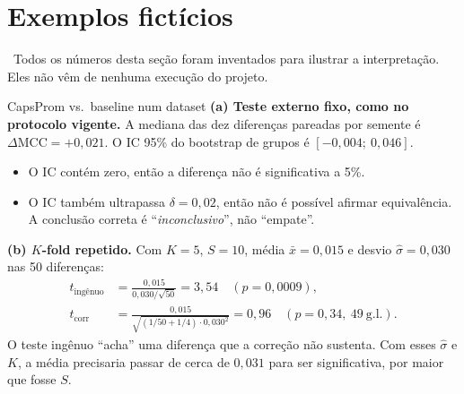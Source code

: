 \documentclass[11pt,a4paper]{article}
\newcommand{\etiqueta}[2]{\tcbox[on line, colback=#1!10, colframe=#1!75!black,
  boxrule=0.4pt, arc=1.2pt, left=1.5pt, right=1.5pt, top=0pt, bottom=0pt,
  fontupper=\sffamily\scriptsize\bfseries]{#2}}
\newcommand{\fic}{\etiqueta{oiPurple}{Fictício}}
\newcommand{\MCC}{\mathrm{MCC}}
\begin{document}
\section{Exemplos fictícios}
\label{sec:exemplos}

\fic\ Todos os números desta seção foram inventados para ilustrar a interpretação. Eles não vêm de nenhuma execução do projeto.

\begin{exemplo}{CapsProm vs.\ baseline num dataset}
\textbf{(a) Teste externo fixo, como no protocolo vigente.} A mediana das dez diferenças pareadas por semente é $\Delta\MCC=+0{,}021$. O IC 95\% do bootstrap de grupos é $[-0{,}004;\ 0{,}046]$.
\begin{itemize}[leftmargin=1.2em]
\item O IC contém zero, então a diferença não é significativa a 5\%.
\item O IC também ultrapassa $\delta=0{,}02$, então não é possível afirmar equivalência. A conclusão correta é ``\emph{inconclusivo}'', não ``empate''.
\end{itemize}

\textbf{(b) $K$-fold repetido.} Com $K=5$, $S=10$, média $\bar{x}=0{,}015$ e desvio $\hat{\sigma}=0{,}030$ nas 50 diferenças:
\begin{align*}
t_{\text{ingênuo}}&=\frac{0{,}015}{0{,}030/\sqrt{50}}=3{,}54\quad(p=0{,}0009),\\
t_{\text{corr}}&=\frac{0{,}015}{\sqrt{(1/50+1/4)\cdot0{,}030^2}}=0{,}96\quad(p=0{,}34,\ 49\ \text{g.l.}).
\end{align*}
O teste ingênuo ``acha'' uma diferença que a correção não sustenta. Com esses $\hat{\sigma}$ e $K$, a média precisaria passar de cerca de $0{,}031$ para ser significativa, por maior que fosse $S$.
\end{exemplo}
\end{document}
